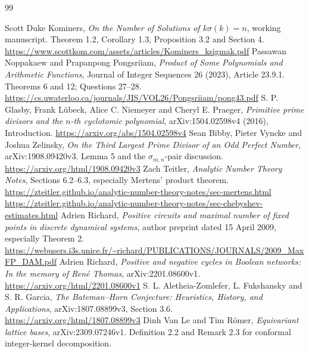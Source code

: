 {\small{}\relax
\begin{thebibliography}{99}
 Scott Duke Kominers, \emph{On the Number of Solutions of $k\sigma(k)=n$}, working manuscript. Theorem 1.2, Corollary 1.3, Proposition 3.2 and Section 4.\newline
\url{https://www.scottkom.com/assets/articles/Kominers_ksigmak.pdf}
 Passawan Noppakaew and Prapanpong Pongsriiam, \emph{Product of Some Polynomials and Arithmetic Functions}, Journal of Integer Sequences 26 (2023), Article 23.9.1. Theorems 6 and 12; Questions 27--28.\newline
\url{https://cs.uwaterloo.ca/journals/JIS/VOL26/Pongsriiam/pong43.pdf}
 S. P. Glasby, Frank L\"ubeck, Alice C. Niemeyer and Cheryl E. Praeger, \emph{Primitive prime divisors and the $n$-th cyclotomic polynomial}, arXiv:1504.02598v4 (2016), Introduction.\newline
\url{https://arxiv.org/abs/1504.02598v4}
 Sean Bibby, Pieter Vyncke and Joshua Zelinsky, \emph{On the Third Largest Prime Divisor of an Odd Perfect Number}, arXiv:1908.09420v3. Lemma 5 and the $\sigma_{m,n}$-pair discussion.\newline
\url{https://arxiv.org/html/1908.09420v3}
 Zach Teitler, \emph{Analytic Number Theory Notes}, Sections 6.2--6.3, especially Mertens' product theorem.\newline
\url{https://zteitler.github.io/analytic-number-theory-notes/sec-mertens.html}\newline
\url{https://zteitler.github.io/analytic-number-theory-notes/sec-chebyshev-estimates.html}
 Adrien Richard, \emph{Positive circuits and maximal number of fixed points in discrete dynamical systems}, author preprint dated 15 April 2009, especially Theorem 2.\newline
\url{https://webusers.i3s.unice.fr/~richard/PUBLICATIONS/JOURNALS/2009_MaxFP_DAM.pdf}
 Adrien Richard, \emph{Positive and negative cycles in Boolean networks: In the memory of Ren\'e Thomas}, arXiv:2201.08600v1.\newline
\url{https://arxiv.org/html/2201.08600v1}
 S. L. Aletheia-Zomlefer, L. Fukshansky and S. R. Garcia, \emph{The Bateman--Horn Conjecture: Heuristics, History, and Applications}, arXiv:1807.08899v3, Section 3.6.\newline
\url{https://arxiv.org/html/1807.08899v3}
 Dinh Van Le and Tim R\"omer, \emph{Equivariant lattice bases}, arXiv:2309.07246v1. Definition 2.2 and Remark 2.3 for conformal integer-kernel decomposition.\newline

\end{thebibliography}}
